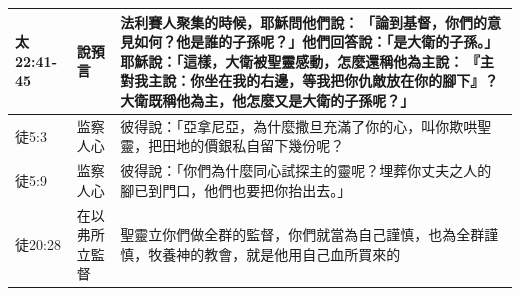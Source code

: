 \begin{table}[H]
\begin{tabular}{p{6em}|p{4em}|p{37em}}
太22:41-45 &說預言&法利賽人聚集的時候，耶穌問他們說： 「論到基督，你們的意見如何？他是誰的子孫呢？」他們回答說：「是大衛的子孫。」耶穌說：「這樣，大衛被聖靈感動，怎麼還稱他為主說： 『主對我主說：你坐在我的右邊，等我把你仇敵放在你的腳下』？大衛既稱他為主，他怎麼又是大衛的子孫呢？」\\  \midrule



徒5:3&监察人心&彼得說：「亞拿尼亞，為什麼撒旦充滿了你的心，叫你欺哄聖靈，把田地的價銀私自留下幾份呢？\\  \midrule
徒5:9&监察人心&彼得說：「你們為什麼同心試探主的靈呢？埋葬你丈夫之人的腳已到門口，他們也要把你抬出去。」\\  \midrule

徒20:28&在以弗所立監督&聖靈立你們做全群的監督，你們就當為自己謹慎，也為全群謹慎，牧養神的教會，就是他用自己血所買來的\\ \bottomrule

\end{tabular}%
\end{table}





